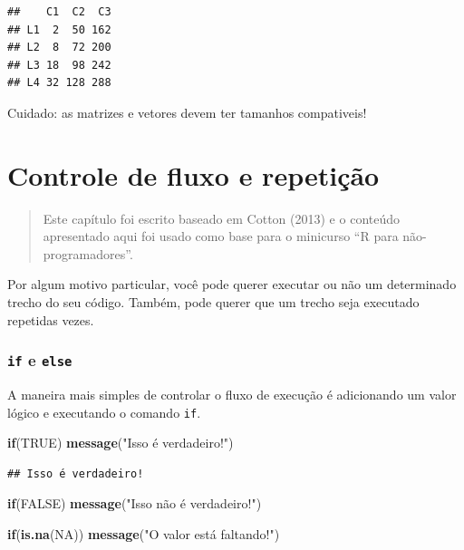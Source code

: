 \documentclass[
]{book}
\newenvironment{Shaded}{\begin{snugshade}}{\end{snugshade}}
\newcommand{\ConstantTok}[1]{\textcolor[rgb]{0.56,0.35,0.01}{#1}}
\newcommand{\ControlFlowTok}[1]{\textcolor[rgb]{0.13,0.29,0.53}{\textbf{#1}}}
\newcommand{\FunctionTok}[1]{\textcolor[rgb]{0.13,0.29,0.53}{\textbf{#1}}}
\newcommand{\NormalTok}[1]{#1}
\newcommand{\StringTok}[1]{\textcolor[rgb]{0.31,0.60,0.02}{#1}}
\begin{document}
\begin{verbatim}
##    C1  C2  C3
## L1  2  50 162
## L2  8  72 200
## L3 18  98 242
## L4 32 128 288
\end{verbatim}

Cuidado: as matrizes e vetores devem ter tamanhos compativeis!

\chapter{Controle de fluxo e repetição}\label{controle-de-fluxo-e-repetiuxe7uxe3o}

\begin{quote}
Este capítulo foi escrito baseado em Cotton (2013) e o conteúdo apresentado aqui foi usado como base para o minicurso ``R para não-programadores''.
\end{quote}

Por algum motivo particular, você pode querer executar ou não um determinado trecho do seu código.
Também, pode querer que um trecho seja executado repetidas vezes.

\subsection{\texorpdfstring{\texttt{if} e \texttt{else}}{if e else}}\label{if-e-else}

A maneira mais simples de controlar o fluxo de execução é adicionando um valor lógico e executando o comando \texttt{if}.

\begin{Shaded}
\begin{Highlighting}[]
\ControlFlowTok{if}\NormalTok{(}\ConstantTok{TRUE}\NormalTok{) }\FunctionTok{message}\NormalTok{(}\StringTok{"Isso é verdadeiro!"}\NormalTok{)}
\end{Highlighting}
\end{Shaded}

\begin{verbatim}
## Isso é verdadeiro!
\end{verbatim}

\begin{Shaded}
\begin{Highlighting}[]
\ControlFlowTok{if}\NormalTok{(}\ConstantTok{FALSE}\NormalTok{) }\FunctionTok{message}\NormalTok{(}\StringTok{"Isso não é verdadeiro!"}\NormalTok{)}

\ControlFlowTok{if}\NormalTok{(}\FunctionTok{is.na}\NormalTok{(}\ConstantTok{NA}\NormalTok{)) }\FunctionTok{message}\NormalTok{(}\StringTok{"O valor está faltando!"}\NormalTok{)}
\end{Highlighting}
\end{Shaded}
\end{document}

